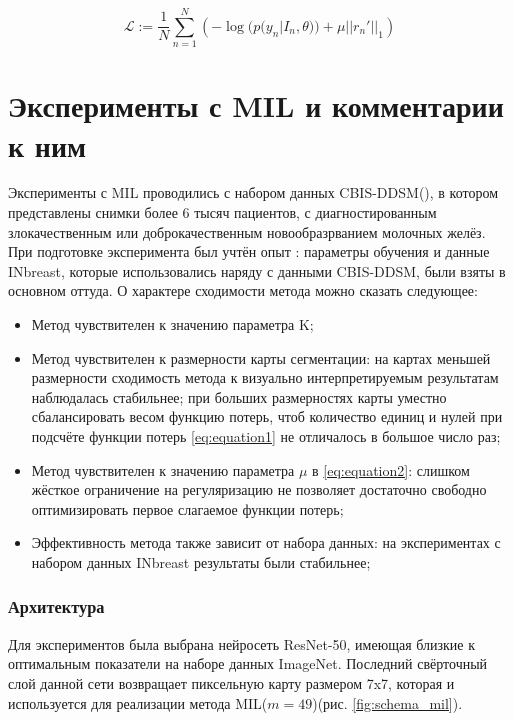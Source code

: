 \begin{equation}
  \label{eq:equation2}
  \mathcal{L} := \frac{1}{N}\sum_{n=1}^N\left(-\log(p(y_n|I_n,\theta)) + \mu||r_n'||_1\right)
\end{equation}


\section{Эксперименты с MIL и комментарии к ним}


Эксперименты с MIL проводились с набором данных CBIS-DDSM(\cite{lee_curated_2017}), в котором представлены снимки более 6 тысяч пациентов, с диагностированным  злокачественным или доброкачественным новообразрванием молочных желёз. При подготовке эксперимента был учтён опыт \cite{zhu_deep_2016}: параметры обучения и данные INbreast, которые использовались наряду с данными CBIS-DDSM, были взяты в основном оттуда. О характере сходимости метода можно сказать следующее:

\begin{itemize}
    \item Метод чувствителен к значению параметра K;
    \item Метод чувствителен к размерности карты сегментации: на картах меньшей размерности сходимость метода к визуально интерпретируемым результатам наблюдалась стабильнее; при больших размерностях карты уместно сбалансировать весом  функцию потерь, чтоб количество единиц и нулей при подсчёте функции потерь \ref{eq:equation1} не отличалось в большое число раз;
    \item Метод чувствителен к значению параметра $\mu$ в \ref{eq:equation2}: слишком жёсткое ограничение на регуляризацию не позволяет достаточно свободно оптимизировать  первое слагаемое функции потерь;
    \item Эффективность метода также зависит от набора данных: на экспериментах с набором данных INbreast результаты были стабильнее;
\end{itemize}




\subsubsection{Архитектура}

Для экспериментов была выбрана нейросеть ResNet-50, имеющая близкие к оптимальным показатели на наборе данных ImageNet. Последний свёрточный слой данной сети возвращает пиксельную карту размером 7x7, которая и используется для реализации метода MIL($m = 49$)(рис. \ref{fig:schema_mil}). 


